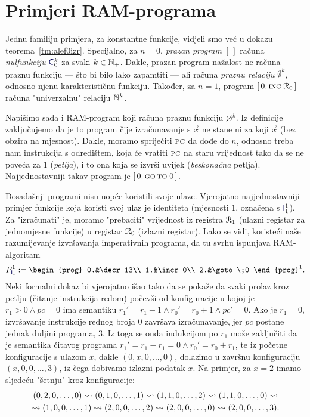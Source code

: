 \section{Primjeri RAM-programa}

Jednu familiju primjera, za konstantne funkcije, vidjeli smo već u dokazu teorema~\ref{tm:alef0izr}. Specijalno, za $n=0$, \emph{prazan program} $[\,]$ računa \emph{nulfunkciju} $\f{C}_0^k$ za svaki $k\in{\mathbb N}_+$. Dakle, prazan program nažalost ne računa praznu funkciju --- što bi bilo lako zapamtiti --- ali računa \emph{praznu relaciju} $\emptyset^k$, odnosno njenu karakterističnu funkciju. Također, za $n=1$, program $[\,0.\,\textsc{inc}\;\mathcal R_{0}\,]$ računa "univerzalnu" relaciju ${\mathbb N}^k$.

Napišimo sada i RAM-program koji računa praznu funkciju $\varnothing^k$. Iz definicije zaključujemo da je to program čije izračunavanje s $\vec x$ ne stane ni za koji $\vec x$ (bez obzira na mjesnost). Dakle, moramo spriječiti $\textsc{pc}$ da dođe do $n$, odnosno treba nam instrukcija s odredištem, koja će vratiti $\textsc{pc}$ na staru vrijednost tako da se ne poveća za $1$ (\emph{petlja}), i to ona koja se izvrši uvijek (\emph{beskonačna} petlja). Najjednostavniji takav program je $[\,0.\,\textsc{go\,to}\;0\,]$.

Dosadašnji programi nisu uopće koristili svoje ulaze. Vjerojatno najjednostavniji primjer funkcije koja koristi svoj ulaz je identiteta (mjesnosti $1$, označena s $\f{I}_1^1$). Za "izračunati" je, moramo "prebaciti" vrijednost iz registra $\mathcal R_{1}$ (ulazni registar za jednomjesne funkcije) u registar $\mathcal R_{0}$ (izlazni registar). Lako se vidi, koristeći naše razumijevanje izvršavanja imperativnih programa, da tu svrhu ispunjava RAM-algoritam
\begin{equation}
    P_{\f I_1}^1:=\begin{prog}
        0.&\decr13\\
        1.&\incr0\\
        2.&\goto\;0
    \end{prog}^1\text.
\end{equation}
Neki formalni dokaz bi vjerojatno išao tako da se pokaže da svaki prolaz kroz petlju (čitanje instrukcija redom) počevši od konfiguracije u kojoj je $r_1>0\land pc=0$ ima semantiku $r_1'=r_1-1\land r_0'=r_0+1\land pc'=0$. Ako je $r_1=0$, izvršavanje instrukcije rednog broja $0$ završava izračunavanje, jer $pc$ postane jednak duljini programa, $3$. Iz toga se onda indukcijom po $r_1$ može zaključiti da je semantika čitavog programa $r_1'=r_1-r_1=0\land r_0'=r_0+r_1$, te iz početne konfiguracije s ulazom $x$, dakle $(0,x,0,\dotsc,0)$, dolazimo u završnu konfiguraciju $(x,0,0,\dotsc,3)$, iz čega dobivamo izlazni podatak $x$. Na primjer, za $x=2$ imamo sljedeću "šetnju" kroz konfiguracije:
\begin{multline}
    (0,2,0,\dotsc,0)\leadsto
    (0,1,0,\dotsc,1)\leadsto
    (1,1,0,\dotsc,2)\leadsto
    (1,1,0,\dotsc,0)\leadsto\\
    \leadsto(1,0,0,\dotsc,1)\leadsto
    (2,0,0,\dotsc,2)\leadsto
    (2,0,0,\dotsc,0)\leadsto
    (2,0,0,\dotsc,3)\text.
\end{multline}

